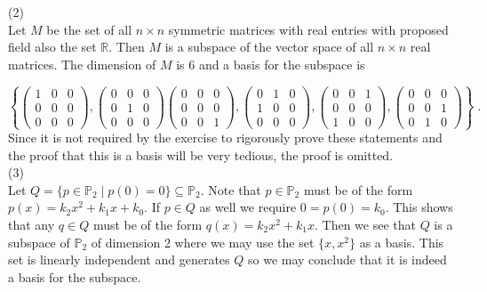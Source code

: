 \documentclass[11pt]{article}
\begin{document}
(2) \\

Let $M$ be the set of all $n \times n$ symmetric matrices with real entries with proposed field also the set $\mathbb{R}$. Then $M$ is a subspace of the vector space of all $n \times n$ real matrices. The dimension of $M$ is 6 and a basis for the subspace is 

$$\left\{\begin{pmatrix}
1&0&0\\
0&0&0\\
0&0&0
\end{pmatrix}
,
\begin{pmatrix}
0&0&0\\
0&1&0\\
0&0&0
\end{pmatrix}
\begin{pmatrix}
0&0&0\\
0&0&0\\
0&0&1
\end{pmatrix},
\begin{pmatrix}
0&1&0\\
1&0&0\\
0&0&0
\end{pmatrix}
,
\begin{pmatrix}
0&0&1\\
0&0&0\\
1&0&0
\end{pmatrix},
\begin{pmatrix}
0&0&0\\
0&0&1\\
0&1&0
\end{pmatrix}\right\}\;.
$$
Since it is not required by the exercise to rigorously prove these statements and the proof that this is a basis will be very tedious, the proof is omitted.\\

(3)\\

Let $Q = \{p \in \mathbb{P}_2 \; | \; p(0) = 0\} \subseteq \mathbb{P}_2$. Note that $p \in \mathbb{P}_2$ must be of the form $p(x)=k_2x^2 +k_1x + k_0$. If $p \in Q$ as well we require $0 = p(0) = k_0$. This shows that any $q \in Q$ must be of the form $q(x) = k_2x^2 + k_1x$. Then we see that $Q$ is a subspace of $\mathbb{P}_2$ of dimension 2 where we may use the set $\{x, x^2\}$ as a basis. This set is linearly independent and generates $Q$ so we may conclude that it is indeed a basis for the subspace. 
\end{document}
